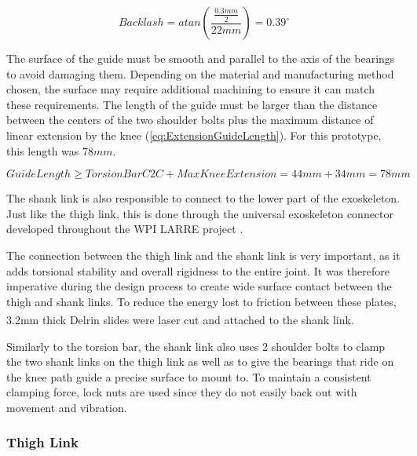 \begin{equation}
    Backlash = atan(\frac{\frac{0.3mm}{2}}{22mm}) = 0.39^\circ
    \label{eq:ShankLinkBacklash}
\end{equation}

The surface of the guide must be smooth and parallel to the axis of the bearings to avoid damaging them. Depending on the material and manufacturing method chosen, the surface may require additional machining to ensure it can match these requirements. The length of the guide must be larger than the distance between the centers of the two shoulder bolts plus the maximum distance of linear extension by the knee (\autoref{eq:ExtensionGuideLength}). For this prototype, this length was \(78mm\).

\begin{equation}
    GuideLength \geq TorsionBarC2C + MaxKneeExtension = 44mm + 34mm = 78mm
    \label{eq:ExtensionGuideLength}
\end{equation}

The shank link is also responsible to connect to the lower part of the exoskeleton. Just like the thigh link, this is done through the universal exoskeleton connector developed throughout the WPI LARRE project \cite{SpringWrapClutchKnee}.

The connection between the thigh link and the shank link is very important, as it adds torsional stability and overall rigidness to the entire joint. It was therefore imperative during the design process to create wide surface contact between the thigh and shank links. To reduce the energy lost to friction between these plates, 3.2mm thick Delrin\textsuperscript{\textregistered} slides were laser cut and attached to the shank link. 

Similarly to the torsion bar, the shank link also uses 2 shoulder bolts to clamp the two shank links on the thigh link as well as to give the bearings that ride on the knee path guide a precise surface to mount to. To maintain a consistent clamping force, lock nuts are used since they do not easily back out with movement and vibration. 

\subsubsection{Thigh Link}


